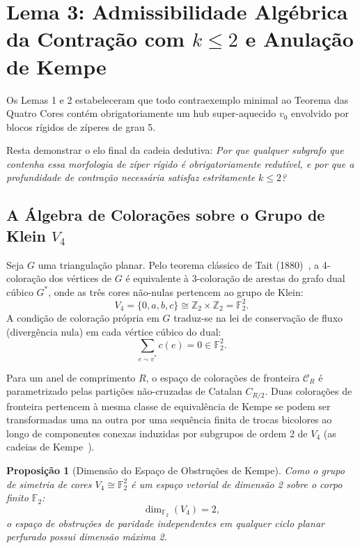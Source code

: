 \documentclass[11pt,a4paper]{article}
\theoremstyle{plain}
\newtheorem{proposition}[theorem]{Proposição}
\theoremstyle{definition}
\begin{document}
\section{Lema 3: Admissibilidade Algébrica da Contração com \texorpdfstring{$k \le 2$}{k <= 2} e Anulação de Kempe}

Os Lemas 1 e 2 estabeleceram que todo contraexemplo minimal ao Teorema das Quatro Cores contém obrigatoriamente um hub super-aquecido $v_0$ envolvido por blocos rígidos de zíperes de grau 5. 

Resta demonstrar o elo final da cadeia dedutiva: \emph{Por que qualquer subgrafo que contenha essa morfologia de zíper rígido é obrigatoriamente redutível, e por que a profundidade de contração necessária satisfaz estritamente $k \le 2$?}

\subsection{A Álgebra de Colorações sobre o Grupo de Klein \texorpdfstring{$V_4$}{V4}}

Seja $G$ uma triangulação planar. Pelo teorema clássico de Tait (1880)~\cite{tait1880remarks}, a 4-coloração dos vértices de $G$ é equivalente à 3-coloração de arestas do grafo dual cúbico $G^*$, onde as três cores não-nulas pertencem ao grupo de Klein:
\begin{equation}
V_4 = \{0, a, b, c\} \cong \mathbb{Z}_2 \times \mathbb{Z}_2 = \mathbb{F}_2^2.
\end{equation}
A condição de coloração própria em $G$ traduz-se na lei de conservação de fluxo (divergência nula) em cada vértice cúbico do dual:
\begin{equation}
\sum_{e \sim v^*} c(e) = 0 \in \mathbb{F}_2^2.
\end{equation}

Para um anel de comprimento $R$, o espaço de colorações de fronteira $\mathcal{C}_R$ é parametrizado pelas partições não-cruzadas de Catalan $C_{R/2}$. Duas colorações de fronteira pertencem à mesma classe de equivalência de Kempe se podem ser transformadas uma na outra por uma sequência finita de trocas bicolores ao longo de componentes conexas induzidas por subgrupos de ordem 2 de $V_4$ (as cadeias de Kempe~\cite{kempe1879geographical}).

\begin{proposition}[Dimensão do Espaço de Obstruções de Kempe]
Como o grupo de simetria de cores $V_4 \cong \mathbb{F}_2^2$ é um espaço vetorial de dimensão 2 sobre o corpo finito $\mathbb{F}_2$:
\begin{equation}
\dim_{\mathbb{F}_2}(V_4) = 2,
\end{equation}
o espaço de obstruções de paridade independentes em qualquer ciclo planar perfurado possui dimensão máxima 2.
\end{proposition}
\end{document}
